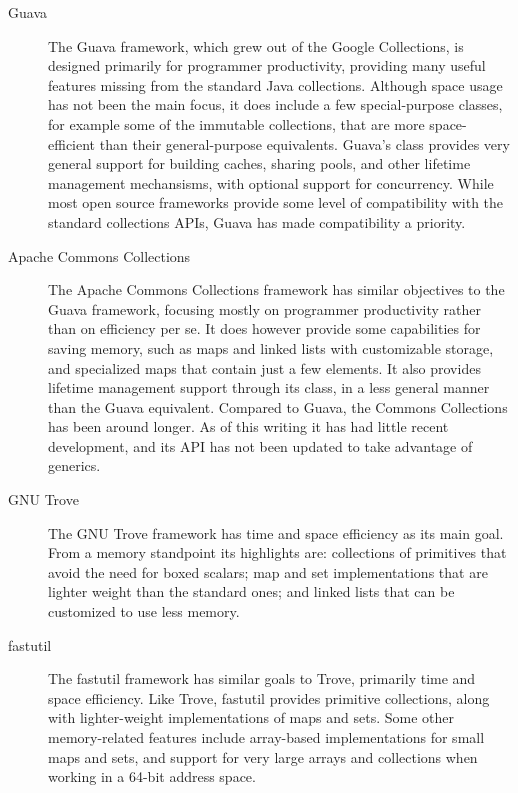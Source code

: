 \begin{description}

\item[Guava] The Guava framework, which grew out of the Google Collections,
is designed primarily for programmer productivity, providing many useful
features missing from the standard Java collections. 
Although space usage has not been the main focus, it does include a
few special-purpose classes, for example some of the immutable collections, that
are more space-efficient than their general-purpose equivalents. Guava's 
class provides very general support for 
building caches, sharing pools, and other lifetime management mechansisms,
with optional support for concurrency. While most open source frameworks provide some level of compatibility with the
standard collections APIs, Guava has made compatibility a priority.

\item[Apache Commons Collections] The Apache Commons Collections framework
has similar objectives to the Guava framework, focusing mostly on programmer productivity rather than on
efficiency per se. 
It does however provide some capabilities for saving memory, such as
maps and linked lists with customizable storage, and specialized 
maps that contain just a few elements. It also provides lifetime management
support through its  class, in a less general
manner than the Guava equivalent. Compared to Guava, the Commons Collections has
been around longer. As of this writing it has had little
recent development, and its API has not been updated to take advantage of
generics.

\item[GNU Trove] The GNU Trove framework has time and space efficiency as
its main goal.
From a memory standpoint its highlights are: collections of primitives that
avoid the need for boxed scalars;  map
and set implementations that are lighter weight than the standard ones; and
linked lists that can be customized to use less memory.

\item[fastutil] The fastutil framework has similar goals to Trove,
primarily time and space efficiency. Like Trove, fastutil provides primitive collections, along with
lighter-weight implementations of maps and sets. Some other memory-related
features include array-based implementations for small
maps and sets, and support for very large arrays and collections when working
in a 64-bit address space.

\end{description}


